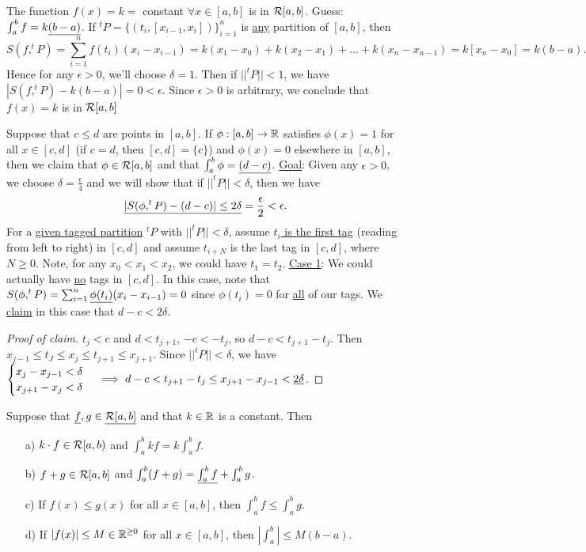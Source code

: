 \documentclass[]{article}
\begin{document}
\begin{example}
	The function $f(x) = k = $ constant $\forall x\in[a,b]$ is in $\mathcal{R}[a,b]$. Guess: \ul{$\int_a^b f = k\underline{(b-a)}$}.
	If $^tP = \{(t_i,[x_{i-1},x_i])\}_{i=1}^n$ is \ul{any} partition of $[a,b]$, then $$S(f,^tP) = \sum_{i=1}^n f(t_i) (x_i - x_{i-1}) = k(x_1 - x_0) + k(x_2 - x_1) + \dots + k(x_n - x_{n-1}) = k[x_n - x_0] = k(b-a).$$ Hence for any $\epsilon>0$, we'll choose $\delta = 1$. Then if $||^tP||<1$, we have $| S(f,^tP) - k(b-a) | = 0 < \epsilon$. Since $\epsilon>0$ is arbitrary, we conclude that $f(x) = k$ is in $\mathcal{R}[a,b]$ 
\end{example}
\begin{example}
	Suppose that $c\leq d$ are points in $[a,b]$. If $\phi:[a,b] \rightarrow \mathbb{R}$ satisfies \ul{$\phi(x) = 1$} for all $x\in[c,d]$ (if $c=d$, then $[c,d] = \{c\}$) and \ul{$\phi(x) = 0$} elsewhere in $[a,b]$, then we claim that \ul{$\phi \in \mathcal{R}[a,b]$} and that $\int_a^b \phi = \underline{(d-c)}$.
	\ul{Goal}: Given any \ul{$\epsilon>0$}, we choose \ul{$\delta = \frac{\epsilon}{4}$} and we will show that if \ul{$||^tP|| <\delta$}, then we have $$\underline{|S(\phi,^tP) - (d-c)| \leq 2\delta} = \frac{\epsilon}{2} < \epsilon.$$
	For a \ul{given tagged partition} $^tP$ with $||^tP||<\delta$, assume \ul{$t_i$ is the first tag} (reading from left to right) in $[c,d]$ and assume $t_{i+N}$ is the last tag in $[c,d]$, where \ul{$N\geq 0$}.
	Note, for any $x_0<x_1<x_2$, we could have $t_1 = t_2$.
	\ul{Case 1}: We could actually have \ul{no} tags in \ul{$[c,d]$}. In this case, note that $S(\phi,^tP) = \sum_{i=1}^n \underline{\phi(t_i)}(x_i-x_{i-1}) = 0$ since $\phi(t_i) = 0$ for \ul{all} of our tags. We \ul{claim} in this case that \ul{$d-c<2\delta$}.
	\begin{proof}
		[Proof of claim]  $t_j < c$ and $d<t_{j+1}$, $-c<-t_j$, so $d-c<t_{j+1} - t_j$. Then $x_{j-1} \leq t_J \leq x_j \leq t_{j+1} \leq x_{j+1}$. Since $||^tP|| < \delta$, we have $\begin{cases} x_j - x_{j-1} < \delta \\ x_{j+1} - x_j < \delta \end{cases} \implies d-c < t_{j+1} - t_j \leq x_{j+1} - x_{j-1} < \underline{2\delta}$.
	\end{proof}
\end{example}
\begin{theorem}
	Suppose that $\underline{f},g\in\underline{\mathcal{R}[a,b]}$ and that \ul{$k\in\mathbb{R}$} is a constant. Then
	\begin{enumerate}
		\item[a)] $k\cdot f \in \mathcal{R}[a,b)$ and $\int_a^b kf = k\int_a^b f$.
		\item[b)] $f+g\in\mathcal{R}[a,b]$ and $\int_a^b(f+g) = \underline{\int_a^b f} + \int_a^b g$.
		\item[c)] If $f(x) \leq g(x)$ for all $x\in[a,b]$, then $\int_a^b f \leq \int_a^b g$.
		\item[d)] If $|f(x)|\leq M\in \mathbb{R}^{\geq0}$ for all $x\in[a,b]$, then $\left|\int_a^b \right| \leq M(b-a)$.
	\end{enumerate}
\end{theorem}
\end{document}
